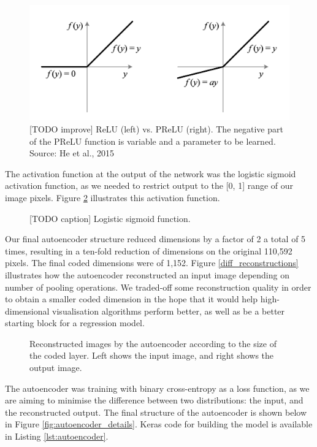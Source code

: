 \begin{figure}[h]
    \centering
    \includegraphics[width=.6\textwidth]{dissertation/figures/relu_prelu.png}
    \caption{[TODO improve] ReLU (left) vs. PReLU (right). The negative part of the PReLU function is variable and a parameter to be learned. Source: He et al., 2015}
    \label{fig:relu_prelu}
\end{figure}

The activation function at the output of the network was the logistic sigmoid activation function, as we needed to restrict output to the [0, 1] range of our image pixels. Figure \ref{fig:sigmoid} illustrates this activation function.

\begin{figure}[h]
    \centering
    \caption{[TODO caption] Logistic sigmoid function.}
    \label{fig:sigmoid}
\end{figure}

Our final autoencoder structure reduced dimensions by a factor of 2 a total of 5 times, resulting in a ten-fold reduction of dimensions on the original 110,592 pixels. The final coded dimensions were of 1,152. Figure \ref{diff_reconstructions} illustrates how the autoencoder reconstructed an input image depending on number of pooling operations. We traded-off some reconstruction quality in order to obtain a smaller coded dimension in the hope that it would help high-dimensional visualisation algorithms perform better, as well as be a better starting block for a regression model.

\begin{figure}[h]
    \centering
    \caption{Reconstructed images by the autoencoder according to the size of the coded layer. Left shows the input image, and right shows the output image.}
    \label{fig:diff_reconstructions}
\end{figure}

The autoencoder was training with binary cross-entropy as a loss function, as we are aiming to minimise the difference between two distributions: the input, and the reconstructed output. The final structure of the autoencoder is shown below in Figure \ref{fig:autoencoder_details}. Keras code for building the model is available in Listing \ref{lst:autoencoder}.

